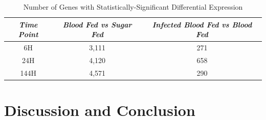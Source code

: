 \begin{table}[H]
  \centering
  \begin{tabular}{c c c} \hline
  \emph{Time Point} & \emph{Blood Fed vs Sugar Fed} & \emph{Infected Blood Fed vs Blood Fed} \\ \hline
  6H & 3,111 & 271 \\ \hline
  24H & 4,120 & 658 \\ \hline
  144H & 4,571 & 290 \\ \hline
  \end{tabular}
  \caption{Number of Genes with Statistically-Significant Differential Expression}
  \label{tab:stat-sig-genes}
\end{table}

\section{Discussion and Conclusion}
